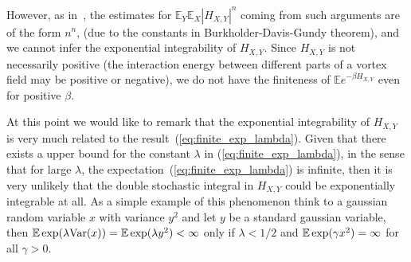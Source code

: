 However, as in~\cite{Fl2}, the estimates for $\mathbb{E}_{Y}\mathbb{E}%
_{X}\left| H_{X,Y}\right| ^{n}$ coming from such arguments are of the
form $n^{n}$, (due to the constants in Burkholder-Davis-Gundy theorem), and
we cannot infer the exponential integrability of $H_{X,Y}$. Since $%
H_{X,Y}$ is not necessarily positive (the interaction energy between
different parts of a vortex field may be positive or negative), we do
not have the finiteness  of $\mathbb{E}e^{-\beta H_{X,Y}}$ even for positive $%
\beta $.

At this point we would like to remark that the exponential integrability of
$H_{X,Y}$ is very much related to the
result~(\ref{eq:finite_exp_lambda}). Given that there exists a upper bound for
the constant $\lambda$ in (\ref{eq:finite_exp_lambda}), in the sense that for
large $\lambda$, the expectation~(\ref{eq:finite_exp_lambda}) is infinite,
then it is very unlikely that  the double stochastic integral in $H_{X,Y}$ could
be exponentially integrable at all.  
As a simple example of this phenomenon think to a gaussian random variable $x$
with variance $y^2$ and let $y$ be a standard gaussian variable, then $\operatorname{{\mathbb E}}
\exp (\lambda \text{Var}(x)) =  \operatorname{{\mathbb E}} \exp (\lambda y^2) < \infty$ only if $\lambda <
1/2$ and $\operatorname{{\mathbb E}} \exp (\gamma x^2) = \infty$ for all $\gamma >0$.

  


